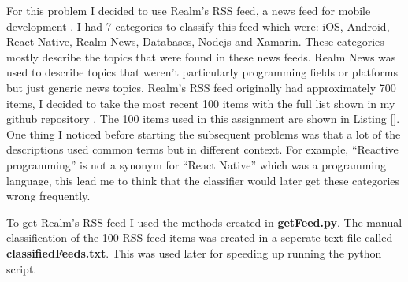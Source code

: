 \documentclass[letterpaper,11pt]{article}
\begin{document}
For this problem I decided to use Realm's RSS feed, a news feed for mobile development \cite{realmref}. I had 7 categories to classify this feed which were: iOS, Android, React Native, Realm News, Databases, Nodejs and Xamarin. These categories mostly describe the topics that were found in these news feeds. Realm News was used to describe topics that weren't particularly programming fields or platforms but just generic news topics. Realm's RSS feed originally had approximately 700 items, I decided to take the most recent 100 items with the full list shown in my github repository \cite{github}. The 100 items used in this assignment are shown in Listing \ref{}. One thing I noticed before starting the subsequent problems was that a lot of the descriptions used common terms but in different context. For example, ``Reactive programming'' is not a synonym for ``React Native'' which was a programming language, this lead me to think that the classifier would later get these categories wrong frequently.

To get Realm's RSS feed I used the methods created in \textbf{getFeed.py}. The manual classification of the 100 RSS feed items was created in a seperate text file called \textbf{classifiedFeeds.txt}. This was used later for speeding up running the python script.
\end{document}
